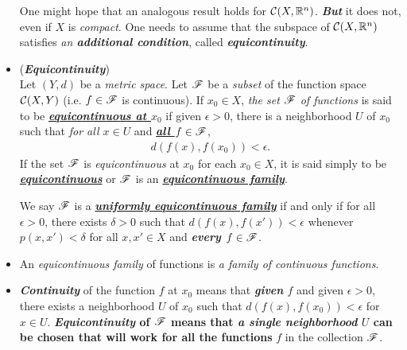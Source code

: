 \documentclass[11pt]{article}
\begin{document}
\begin{itemize}
\begin{remark}
One might hope that an analogous result holds for ${\mathcal C}(X, {\mathbb R}^n)$. \emph{\textbf{But}} it does not, even if $X$ is \emph{compact}. One needs to assume that the subspace of ${\mathcal C}(X, {\mathbb R}^n)$ satisfies \emph{an \textbf{additional condition}}, called \emph{\textbf{equicontinuity}}. 
\end{remark}

\item \begin{definition}  (\emph{\textbf{Equicontinuity}}) \citep{reed1980methods, munkres2000topology} \\
Let $(Y, d)$ be a \emph{metric space}. Let ${\mathscr F}$ be a \emph{subset} of the function space ${\mathcal C}(X, Y)$ (i.e. $f \in {\mathscr F}$ is continuous). If $x_0 \in X$, \emph{the set ${\mathscr F}$ of functions} is said to be \underline{\emph{\textbf{equicontinuous at $x_0$}}} if given $\epsilon >0$, there is a neighborhood $U$ of $x_0$ such that \emph{for all $x \in U$} and \underline{\emph{\textbf{all $f \in {\mathscr F}$}}},
\begin{align*}
d(f(x), f(x_0)) < \epsilon.
\end{align*}
If the set ${\mathscr F}$ is \emph{equicontinuous} at $x_0$ for each $x_0 \in X$, it is said simply to be \underline{\emph{\textbf{equicontinuous}}} or ${\mathscr F}$ is an \underline{\emph{\textbf{equicontinuous family}}}.

We say ${\mathscr F}$ is a \underline{\emph{\textbf{uniformly equicontinuous family}}} if and only if for all $\epsilon >0$, there exists $\delta > 0$ such that $d(f(x), f(x')) < \epsilon$ whenever $p(x, x') < \delta$ for all $x, x' \in X$ and \emph{\textbf{every $f \in {\mathscr F}$}}.
\end{definition}

\item \begin{remark}
An \emph{equicontinuous family} of functions is \emph{a family of continuous functions}.
\end{remark}

\item \begin{remark}
\emph{\textbf{Continuity}} of the function $f$ at $x_0$ means that \emph{\textbf{given} $f$} and given $\epsilon >0$, there exists a neighborhood $U$ of $x_0$ such that $d(f(x), f(x_0)) < \epsilon$ for $x \in U$. 
\textbf{
\emph{\textbf{Equicontinuity}} of ${\mathscr F}$ means that \emph{\textbf{a single neighborhood}} $U$ can be chosen that will \emph{}work for all the functions} $f$ in the collection ${\mathscr F}$.
\end{remark}


\end{itemize}
\end{document}

